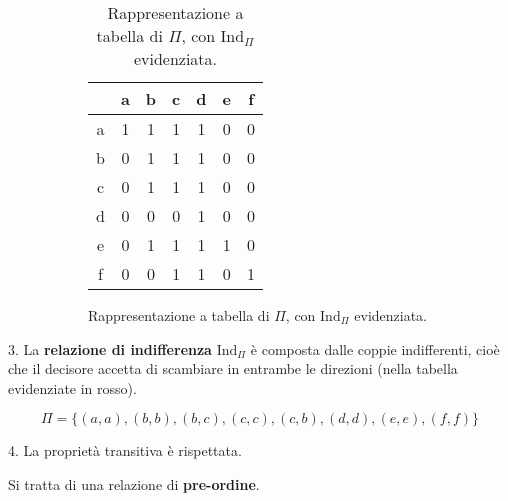 \documentclass[\main/main.tex]{subfiles}
\begin{document}
\begin{figure}
  \begin{subfigure}{0.49\textwidth}
    \begin{table}
      \begin{tabular}{|c|c|c|c|c|c|c|}
        \hline
          & a                    & b                    & c                    & d                    & e                    & f                    \\
        \hline
        a & \cellcolor{red!25} 1 & 1                    & 1                    & 1                    & 0                    & 0                    \\
        \hline
        b & 0                    & \cellcolor{red!25} 1 & \cellcolor{red!25} 1 & 1                    & 0                    & 0                    \\
        \hline
        c & 0                    & \cellcolor{red!25} 1 & \cellcolor{red!25} 1 & 1                    & 0                    & 0                    \\
        \hline
        d & 0                    & 0                    & 0                    & \cellcolor{red!25} 1 & 0                    & 0                    \\
        \hline
        e & 0                    & 1                    & 1                    & 1                    & \cellcolor{red!25} 1 & 0                    \\
        \hline
        f & 0                    & 0                    & 1                    & 1                    & 0                    & \cellcolor{red!25} 1 \\
        \hline
      \end{tabular}
      \caption{Rappresentazione a tabella di $\Pi$, con $\text{Ind}_\Pi$ evidenziata.}
    \end{table}
  \end{subfigure}
  \begin{subfigure}{0.49\textwidth}
    \IndifferencePreferenceRelationship{}
  \end{subfigure}
\end{figure}

3. La \textbf{relazione di indifferenza} $\text{Ind}_\Pi$ è composta dalle coppie indifferenti, cioè che il decisore accetta di scambiare in entrambe le direzioni (nella tabella evidenziate in rosso).

\[
  \Pi = \{(a, a), (b, b), (b,c), (c, c), (c, b), (d,d),(e,e),(f,f)\}
\]

4. La proprietà transitiva è rispettata.

Si tratta di una relazione di \textbf{pre-ordine}.
\end{document}

